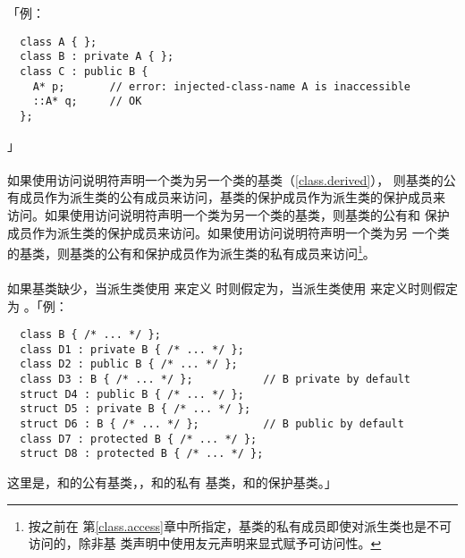 「例：
\begin{lstlisting}
  class A { };
  class B : private A { };
  class C : public B {
    A* p;       // error: injected-class-name A is inaccessible
    ::A* q;     // OK
  };
\end{lstlisting}」

\paragraph{}
如果使用访问说明符声明一个类为另一个类的基类（\ref{class.derived}），
则基类的公有成员作为派生类的公有成员来访问，基类的保护成员作为派生类的保护成员来
访问。如果使用访问说明符声明一个类为另一个类的基类，则基类的公有和
保护成员作为派生类的保护成员来访问。如果使用访问说明符声明一个类为另
一个类的基类，则基类的公有和保护成员作为派生类的私有成员来访问\footnote{按之前在
第\ref{class.access}章中所指定，基类的私有成员即使对派生类也是不可访问的，除非基
类声明中使用友元声明来显式赋予可访问性。}。

\paragraph{}
如果基类缺少，当派生类使用 来定义
时则假定为，当派生类使用 来定义时则假定为
。「例：
\begin{lstlisting}
  class B { /* ... */ };
  class D1 : private B { /* ... */ };
  class D2 : public B { /* ... */ };
  class D3 : B { /* ... */ };           // B private by default
  struct D4 : public B { /* ... */ };
  struct D5 : private B { /* ... */ };
  struct D6 : B { /* ... */ };          // B public by default
  class D7 : protected B { /* ... */ };
  struct D8 : protected B { /* ... */ };
\end{lstlisting}
这里是，和的公有基类，，和的私有
基类，和的保护基类。」

